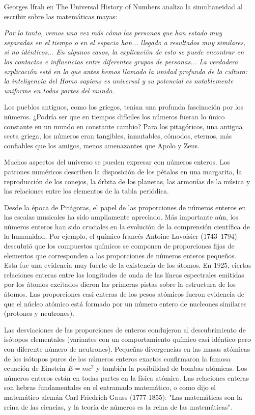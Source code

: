 \documentclass{article}
\begin{document}
Georges Ifrah en The Universal History of Numbers analiza la simultaneidad al
escribir sobre las matem\'aticas mayas:

\textit{Por lo tanto, vemos una vez m\'as c\'omo las personas que han estado muy separadas
en el tiempo o en el espacio han... llegado a resultados muy similares, si no
id\'enticos... En algunos casos, la explicaci\'on de esto se puede encontrar en los
contactos e influencias entre diferentes grupos de personas... La verdadera
explicaci\'on est\'a en lo que antes hemos llamado la unidad profunda de la cultura:
la inteligencia del Homo sapiens es universal y su potencial es notablemente
uniforme en todas partes del mundo.}

Los pueblos antiguos, como los griegos, ten\'ian una profunda fascinaci\'on por los
n\'umeros. ¿Podr\'ia ser que en tiempos dif\'iciles los n\'umeros fueran lo \'unico
constante en un mundo en constante cambio? Para los pitag\'oricos, una antigua
secta griega, los n\'umeros eran tangibles, inmutables, c\'omodos, eternos, m\'as
confiables que los amigos, menos amenazantes que Apolo y Zeus.

Muchos aspectos del universo se pueden expresar con n\'umeros enteros. Los
patrones num\'ericos describen la disposici\'on de los p\'etalos en una margarita, la
reproducci\'on de los conejos, la \'orbita de los planetas, las armon\'ias de la
m\'usica y las relaciones entre los elementos de la tabla peri\'odica.

Desde la \'epoca de Pit\'agoras, el papel de las proporciones de n\'umeros enteros en
las escalas musicales ha sido ampliamente apreciado. M\'as importante a\'un, los
n\'umeros enteros han sido cruciales en la evoluci\'on de la comprensi\'on cient\'ifica
de la humanidad. Por ejemplo, el qu\'imico franc\'es Antoine Lavoisier (1743–1794)
descubri\'o que los compuestos qu\'imicos se componen de proporciones fijas de
elementos que corresponden a las proporciones de n\'umeros enteros peque\~nos. Esta
fue una evidencia muy fuerte de la existencia de los \'atomos. En 1925, ciertas
relaciones enteras entre las longitudes de onda de las l\'ineas espectrales
emitidas por los \'atomos excitados dieron las primeras pistas sobre la estructura
de los \'atomos. Las proporciones casi enteras de los pesos at\'omicos fueron
evidencia de que el n\'ucleo at\'omico est\'a formado por un n\'umero entero de
nucleones similares (protones y neutrones).

Las desviaciones de las proporciones de enteros condujeron al descubrimiento de
is\'otopos elementales (variantes con un comportamiento qu\'imico casi id\'entico pero
con diferente n\'umero de neutrones). Peque\~nas divergencias en las masas at\'omicas
de los is\'otopos puros de los n\'umeros enteros exactos confirmaron la famosa
ecuaci\'on de Einstein $E = mc^2$ y tambi\'en la posibilidad de bombas at\'omicas. Los
n\'umeros enteros est\'an en todas partes en la f\'isica at\'omica. Las relaciones
enteras son hebras fundamentales en el entramado matem\'atico, o como dijo el
matem\'atico alem\'an Carl Friedrich Gauss (1777-1855): "Las matem\'aticas son la
reina de las ciencias, y la teor\'ia de n\'umeros es la reina de las matem\'aticas".
\end{document}
